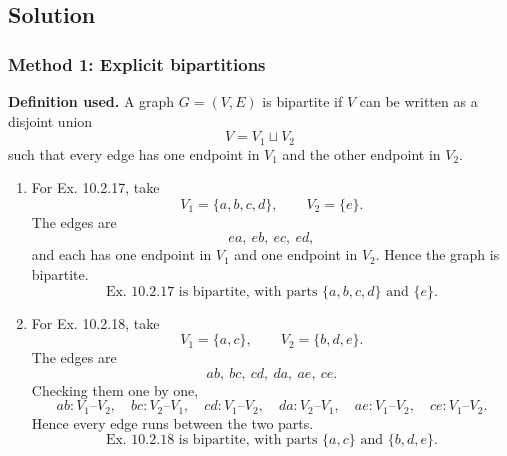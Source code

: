 \documentclass[12pt]{article}
\begin{document}
\begin{center}
\hspace{2.0cm}
\end{center}

\subsection{Solution}

\subsubsection{Method 1: Explicit bipartitions}
\textbf{Definition used.} A graph $G=(V,E)$ is bipartite if $V$ can be written as a disjoint union
\[
V=V_1\sqcup V_2
\]
such that every edge has one endpoint in $V_1$ and the other endpoint in $V_2$.

\begin{enumerate}[label=(\alph*)]
  \item For Ex. 10.2.17, take
  \[
  V_1=\{a,b,c,d\},\qquad V_2=\{e\}.
  \]
  The edges are
  \[
  ea,\ eb,\ ec,\ ed,
  \]
  and each has one endpoint in $V_1$ and one endpoint in $V_2$. Hence the graph is bipartite.
  \[
  \boxed{\text{Ex. 10.2.17 is bipartite, with parts }\{a,b,c,d\}\text{ and }\{e\}.}
  \]

  \item For Ex. 10.2.18, take
  \[
  V_1=\{a,c\},\qquad V_2=\{b,d,e\}.
  \]
  The edges are
  \[
  ab,\ bc,\ cd,\ da,\ ae,\ ce.
  \]
  Checking them one by one,
  \[
  ab:V_1\text{--}V_2,
  \quad bc:V_2\text{--}V_1,
  \quad cd:V_1\text{--}V_2,
  \quad da:V_2\text{--}V_1,
  \quad ae:V_1\text{--}V_2,
  \quad ce:V_1\text{--}V_2.
  \]
  Hence every edge runs between the two parts.
  \[
  \boxed{\text{Ex. 10.2.18 is bipartite, with parts }\{a,c\}\text{ and }\{b,d,e\}.}
  \]
\end{enumerate}
\end{document}
